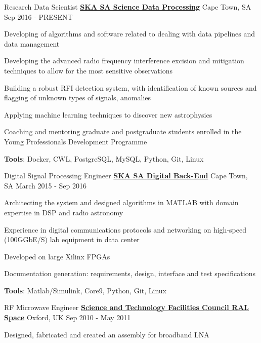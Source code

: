 \begin{cventries}  
  \cventry
  	{Research Data Scientist}
  	{\href{https://www.ska.ac.za/}{\textbf{SKA SA Science Data Processing}}}
  	{Cape Town, SA}
  	{Sep 2016 - PRESENT}
  	{
  		\begin{cvitems}
  				\item {Developing of algorithms and software related to dealing with data pipelines and data management}
  				\item {Developing the advanced radio frequency interference excision and mitigation techniques to allow for the most sensitive observations}   
  				\item {Building a robust RFI detection system, with identification of known sources and flagging of unknown types of signals, anomalies}
  				\item {Applying machine learning techniques to discover new astrophysics}
  				\item {Coaching and mentoring graduate and postgraduate students enrolled in the Young Professionals Development Programme}
  				\item {\textbf{Tools}: Docker, CWL, PostgreSQL, MySQL, Python, Git, Linux}
  		\end{cvitems}
  	}
  \cventry
  	{Digital Signal Processing Engineer}
  	{\href{https://www.ska.ac.za/}{\textbf{SKA SA Digital Back-End}}}
  	{Cape Town, SA}
  	{March 2015 - Sep 2016}
  	{
  		\begin{cvitems}
  				\item {Architecting the system and designed algorithms in MATLAB with domain expertise in DSP and radio astronomy}
  				\item {Experience in digital communications protocols and networking on high-speed (100GGbE/S) lab equipment in data center}
  				\item {Developed on large Xilinx FPGAs}
  				\item {Documentation generation: requirements, design, interface and test specifications}
  				\item {\textbf{Tools}: Matlab/Simulink, Core9, Python, Git, Linux}
  		\end{cvitems}
  	}
  \cventry
  	{RF Microwave Engineer}
  	{\href{https://www.ralspace.stfc.ac.uk/}{\textbf{Science and Technology Facilities Council RAL Space}}}
  	{Oxford, UK}
  	{Sep 2010 - May 2011}
  	{
  		\begin{cvitems}
  			\item {Designed, fabricated and created an assembly for broadband LNA} 

\end{cvitems}}
\end{cventries}
